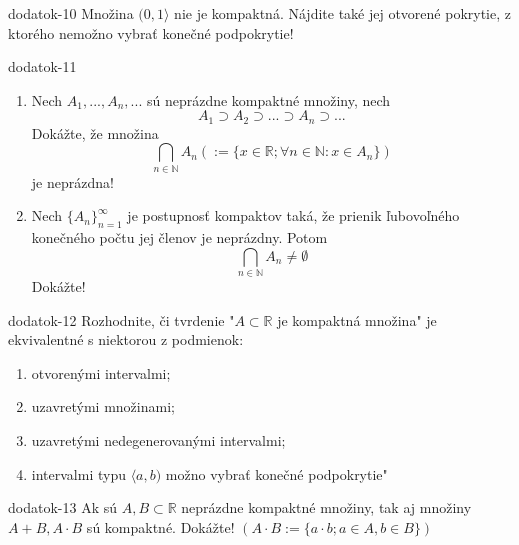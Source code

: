 \begin{defproblem}{dodatok-10}
Množina $(0,1 \rangle$ nie je kompaktná. Nájdite také jej otvorené pokrytie, z ktorého nemožno vybrať konečné podpokrytie!
\end{defproblem}

\begin{defproblem}{dodatok-11}
\begin{enumerate}
\item Nech $A_1,...,A_n,...$ sú neprázdne kompaktné množiny, nech
      $$A_1 \supset A_2 \supset ... \supset A_n \supset ...$$
      Dokážte, že množina
      $$\bigcap_{n \in \mathbb{N}} A_n (:=\{x \in \mathbb{R}; \forall n \in \mathbb{N}: x \in A_n\})$$
      je neprázdna!
\item Nech ${\{A_n\}}_{n=1}^\infty$ je postupnosť kompaktov taká, že prienik
      ľubovoľného konečného počtu jej členov je neprázdny. Potom
      $$\bigcap_{n \in \mathbb{N}} A_n \neq \emptyset$$
      Dokážte!
\end{enumerate}
\end{defproblem}

\begin{defproblem}{dodatok-12}
Rozhodnite, či tvrdenie "$A \subset \mathbb{R}$ je kompaktná množina" je ekvivalentné s niektorou z podmienok:
\begin{enumerate}
\item otvorenými intervalmi;
\item uzavretými množinami;
\item uzavretými nedegenerovanými intervalmi;
\item intervalmi typu $\langle a,b)$
možno vybrať konečné podpokrytie"
\end{enumerate}
\end{defproblem}

\begin{defproblem}{dodatok-13}
Ak sú $A,B \subset \mathbb{R}$ neprázdne kompaktné množiny, tak aj množiny $A+B,A \cdot B$ sú kompaktné. Dokážte! $(A \cdot B :=\{a \cdot b; a \in A, b \in B\})$
\end{defproblem}
